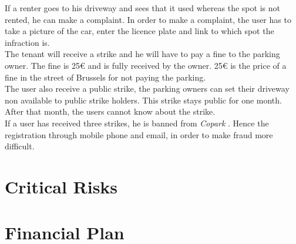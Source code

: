 \documentclass[12pt,a4paper,oneside]{book}
\newcommand{\bp}{\textit{Copark }}
\begin{document}
If a renter goes to his driveway and sees that it used whereas the spot is not rented, he can make a complaint. In order to make a complaint, the user has to take a picture of the car, enter the licence plate and link to which spot the infraction is.\\
The tenant will receive a strike and he will have to pay a fine to the parking owner. The fine is 25\euro{} and is fully received by the owner. 25\euro{} is the price of a fine in the street of Brussels for not paying the parking.\\
The user also receive a public strike, the parking owners can set their driveway non available to public strike holders. This strike stays public for one month. After that month, the users cannot know about the strike.\\
If a user has received three strikes, he is banned from \bp. Hence the registration through mobile phone and email, in order to make fraud more difficult.

\chapter{Critical Risks}

\chapter{Financial Plan}


\backmatter

%

\end{document}
